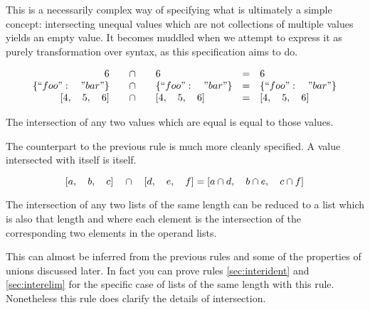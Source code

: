 \documentclass[letterpaper]{article}
\begin{document}
This is a necessarily complex way of specifying what is ultimately a simple
concept: intersecting unequal values which are not collections of multiple
values yields an empty value. It becomes muddled when we attempt to express it
as purely transformation over syntax, as this specification aims to do.

\begin{prule}
\label{sec:interident}
\begin{equation}
\begin{array}{rclcl}
6 \quad&\cap&\quad 6 & = & 6 \\
\{``foo":\quad"bar"\} \quad&\cap&\quad \{``foo":\quad"bar"\}  & = & \{``foo":\quad"bar"\} \\
{[}4,\quad5,\quad6] \quad&\cap&\quad {[}4,\quad5,\quad6] & = & {[}4,\quad5,\quad6] \\
\end{array}
\end{equation}

The intersection of any two values which are equal is equal to those values.
\end{prule}

The counterpart to the previous rule is much more cleanly specified. A value
intersected with itself is itself.

\begin{prule}
\label{sec:interlist}
\begin{equation}
{[}a,\quad b,\quad c] \quad\cap\quad {[}d,\quad e,\quad f]  =  {[}a\cap d,\quad
b\cap e,\quad c\cap f] \\
\end{equation}

The intersection of any two lists of the same length can be reduced to a list
which is also that length and where each element is the intersection of the
corresponding two elements in the operand lists.
\end{prule}

This can almost be inferred from the previous rules and some of the properties
of unions discussed later. In fact you can prove rules \ref{sec:interident} and
\ref{sec:interelim} for the specific case of lists of the same length with this
rule. Nonetheless this rule does clarify the details of intersection.
\end{document}

